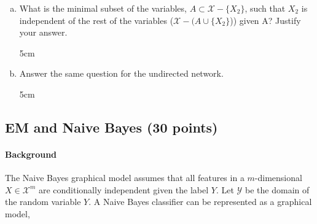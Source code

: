 \documentclass[11pt]{article}
\newcommand{\ztnodesize}{.6}
\newcommand{\answertextheight}{5cm}
\begin{document}
\begin{enumerate}[(a)]
\item What is the minimal subset of the variables, $A\subset \mathcal{X}
  -\{X_2\}$, such that $X_2$ is independent of the rest of the variables
  ($\mathcal{X} - (A\cup{\{ X_2\}}$)) given A? Justify your answer.

\begin{answertext}{\answertextheight}{}
\end{answertext}

\item Answer the same question for the undirected network.

\begin{answertext}{\answertextheight}{}
\end{answertext}

\end{enumerate}




\newpage
\subsection{EM and Naive Bayes (30 points)}

\paragraph{Background}
The Naive Bayes graphical model assumes that all features in a $m$-dimensional
$X \in \mathcal{X}^m$ are conditionally independent given the label $Y$.  Let
$\mathcal{Y}$ be the domain of the random variable $Y$.  A Naive Bayes
classifier can be represented as a graphical model,

\begin{center}
\end{center}
\end{document}
